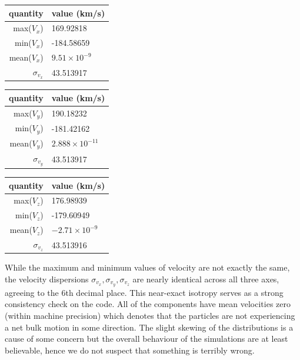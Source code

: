 \vspace*{1cm}
\begin{center}
\begin{tabular}{|r|l|}
  \hline
  quantity & value (km/s) \\ \hline
  max($V_{x}$)  & 169.92818 \\
  min($V_{x}$)  & -184.58659  \\
  mean($V_{x}$) & $9.51\times10^{-9}$ \\
  $\sigma_{v_x}$ & 43.513917 \\
  \hline
\end{tabular}
\end{center}

\begin{center}
\begin{tabular}{|r|l|}
  \hline
  quantity & value (km/s) \\ \hline
  max($V_{y}$)  & 190.18232 \\
  min($V_{y}$)  & -181.42162 \\
  mean($V_{y}$) & $2.888\times10^{-11}$ \\
  $\sigma_{v_y}$ & 43.513917 \\
  \hline
\end{tabular}
\end{center}

\begin{center}
\begin{tabular}{|r|l|}
  \hline
  quantity & value (km/s) \\ \hline
  max($V_{z}$)  & 176.98939 \\
  min($V_{z}$)  & -179.60949 \\
  mean($V_{z}$) & $-2.71\times10^{-9}$ \\
  $\sigma_{v_z}$ & 43.513916 \\
  \hline
\end{tabular}
\end{center}
\vspace*{1cm}

While the maximum and minimum values of velocity are not exactly the same, the velocity dispersions $\sigma_{v_x}, \sigma_{v_y}, \sigma_{v_z}$ are nearly identical across all three axes, agreeing to the 6th decimal place. This near-exact isotropy serves as a strong consistency check on the code. All of the components have mean velocities zero (within machine precision) which denotes that the particles are not experiencing a net bulk motion in some direction. The slight skewing of the distributions is a cause of some concern but the overall behaviour of the simulations are at least believable, hence we do not suspect that something is terribly wrong.

